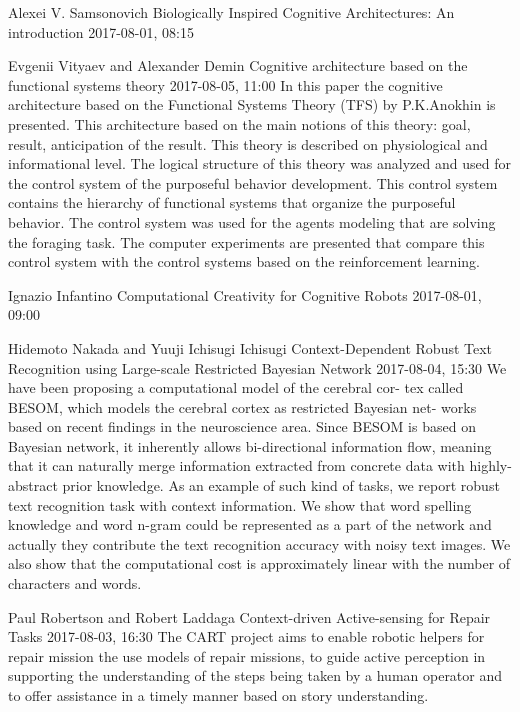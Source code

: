 \documentclass[10pt,fleqn,openany]{book} %
\begin{document}
\begin{enumerate}
		
		\paperabstract
		{Alexei V. Samsonovich}
		{Biologically Inspired Cognitive Architectures: An introduction}
		{2017-08-01, 08:15}
		{}
		
		
		\paperabstract
		{Evgenii Vityaev and Alexander Demin}
		{Cognitive architecture based on the functional systems theory}
		{2017-08-05, 11:00}
		{In this paper the cognitive architecture based on the Functional Systems Theory (TFS) by P.K.Anokhin is presented. This architecture based on the main notions of this theory: goal, result, anticipation of the result. This theory is described on physiological and informational level. The logical structure of this theory was analyzed and used for the control system of the purposeful behavior development. This control system contains the hierarchy of functional systems that organize the purposeful behavior. The control system was used for the agents modeling that are solving the foraging task. The computer experiments are presented that compare this control system with the control systems based on the reinforcement learning.}
		
		
		\paperabstract
		{Ignazio Infantino}
		{Computational Creativity for Cognitive Robots}
		{2017-08-01, 09:00}
		{}
		
		
		\paperabstract
		{Hidemoto Nakada and Yuuji Ichisugi Ichisugi}
		{Context-Dependent Robust Text Recognition using Large-scale Restricted Bayesian Network}
		{2017-08-04, 15:30}
		{We have been proposing a computational model of the cerebral cor- tex called BESOM, which models the cerebral cortex as restricted Bayesian net- works based on recent findings in the neuroscience area. Since BESOM is based on Bayesian network, it inherently allows bi-directional information flow, meaning that it can naturally merge information extracted from concrete data with highly- abstract prior knowledge. As an example of such kind of tasks, we report robust text recognition task with context information. We show that word spelling knowledge and word n-gram could be represented as a part of the network and actually they contribute the text recognition accuracy with noisy text images. We also show that the computational cost is approximately linear with the number of characters and words.}
		
		
		\paperabstract
		{Paul Robertson and Robert Laddaga}
		{Context-driven Active-sensing for Repair Tasks}
		{2017-08-03, 16:30}
		{The CART project aims to enable robotic helpers for repair mission the use models of repair missions, to guide active perception in supporting the understanding of the steps being taken by a human operator and to offer assistance in a timely manner based on story understanding.}
		

\end{enumerate}
\end{document}
